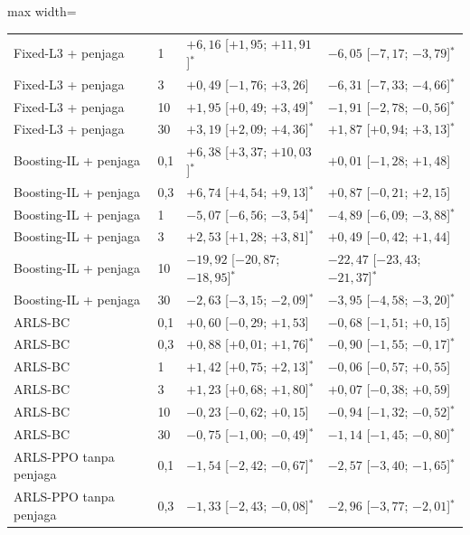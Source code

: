 \begin{table}[htbp]
\begin{adjustbox}{max width=\textwidth}
\begin{tabular}{llll}
Fixed-L3 + penjaga & 1 & $+6{,}16$ [$+1{,}95$; $+11{,}91$]$^{*}$ & $-6{,}05$ [$-7{,}17$; $-3{,}79$]$^{*}$ \\
Fixed-L3 + penjaga & 3 & $+0{,}49$ [$-1{,}76$; $+3{,}26$] & $-6{,}31$ [$-7{,}33$; $-4{,}66$]$^{*}$ \\
Fixed-L3 + penjaga & 10 & $+1{,}95$ [$+0{,}49$; $+3{,}49$]$^{*}$ & $-1{,}91$ [$-2{,}78$; $-0{,}56$]$^{*}$ \\
Fixed-L3 + penjaga & 30 & $+3{,}19$ [$+2{,}09$; $+4{,}36$]$^{*}$ & $+1{,}87$ [$+0{,}94$; $+3{,}13$]$^{*}$ \\
\addlinespace
Boosting-IL + penjaga & 0{,}1 & $+6{,}38$ [$+3{,}37$; $+10{,}03$]$^{*}$ & $+0{,}01$ [$-1{,}28$; $+1{,}48$] \\
Boosting-IL + penjaga & 0{,}3 & $+6{,}74$ [$+4{,}54$; $+9{,}13$]$^{*}$ & $+0{,}87$ [$-0{,}21$; $+2{,}15$] \\
Boosting-IL + penjaga & 1 & $-5{,}07$ [$-6{,}56$; $-3{,}54$]$^{*}$ & $-4{,}89$ [$-6{,}09$; $-3{,}88$]$^{*}$ \\
Boosting-IL + penjaga & 3 & $+2{,}53$ [$+1{,}28$; $+3{,}81$]$^{*}$ & $+0{,}49$ [$-0{,}42$; $+1{,}44$] \\
Boosting-IL + penjaga & 10 & $-19{,}92$ [$-20{,}87$; $-18{,}95$]$^{*}$ & $-22{,}47$ [$-23{,}43$; $-21{,}37$]$^{*}$ \\
Boosting-IL + penjaga & 30 & $-2{,}63$ [$-3{,}15$; $-2{,}09$]$^{*}$ & $-3{,}95$ [$-4{,}58$; $-3{,}20$]$^{*}$ \\
\addlinespace
ARLS-BC & 0{,}1 & $+0{,}60$ [$-0{,}29$; $+1{,}53$] & $-0{,}68$ [$-1{,}51$; $+0{,}15$] \\
ARLS-BC & 0{,}3 & $+0{,}88$ [$+0{,}01$; $+1{,}76$]$^{*}$ & $-0{,}90$ [$-1{,}55$; $-0{,}17$]$^{*}$ \\
ARLS-BC & 1 & $+1{,}42$ [$+0{,}75$; $+2{,}13$]$^{*}$ & $-0{,}06$ [$-0{,}57$; $+0{,}55$] \\
ARLS-BC & 3 & $+1{,}23$ [$+0{,}68$; $+1{,}80$]$^{*}$ & $+0{,}07$ [$-0{,}38$; $+0{,}59$] \\
ARLS-BC & 10 & $-0{,}23$ [$-0{,}62$; $+0{,}15$] & $-0{,}94$ [$-1{,}32$; $-0{,}52$]$^{*}$ \\
ARLS-BC & 30 & $-0{,}75$ [$-1{,}00$; $-0{,}49$]$^{*}$ & $-1{,}14$ [$-1{,}45$; $-0{,}80$]$^{*}$ \\
\addlinespace
ARLS-PPO tanpa penjaga & 0{,}1 & $-1{,}54$ [$-2{,}42$; $-0{,}67$]$^{*}$ & $-2{,}57$ [$-3{,}40$; $-1{,}65$]$^{*}$ \\
ARLS-PPO tanpa penjaga & 0{,}3 & $-1{,}33$ [$-2{,}43$; $-0{,}08$]$^{*}$ & $-2{,}96$ [$-3{,}77$; $-2{,}01$]$^{*}$ \\

\end{tabular}
\end{adjustbox}
\end{table}
